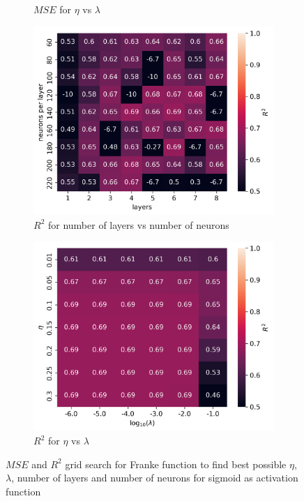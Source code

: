 \documentclass[11pt]{article}
\begin{document}
\begin{figure}[H]
\begin{subfigure}{.5\textwidth}
        \caption{$MSE$ for $\eta$ vs $\lambda$}
        \label{fig:}
    \end{subfigure}
    \begin{subfigure}{.5\textwidth}
        \centering
        \includegraphics[width=\textwidth]{../figures/franke_L_n_test_sigmoid_R2.png}
        \caption{$R^2$ for number of layers vs number of neurons}
        \label{fig:}
    \end{subfigure}
    \begin{subfigure}{.5\textwidth}
        \centering
        \includegraphics[width=\textwidth]{../figures/franke_eta_lmb_sigmoid_R2.png}
        \caption{$R^2$ for $\eta$ vs $\lambda$}
        \label{fig:}
    \end{subfigure}
    \caption{$MSE$ and $R^2$ grid search for Franke function to find best possible $\eta$, $\lambda$, number of layers and number of neurons for sigmoid as activation function}
    \label{fig:franke_grid}
\end{figure}
\end{document}

